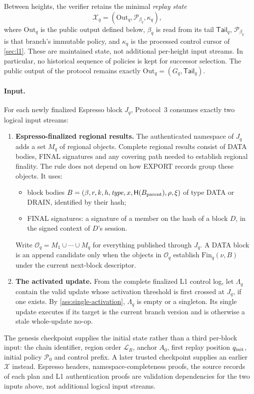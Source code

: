 \documentclass[11pt,a4paper]{article}
\newcommand{\Hash}{\mathsf H}
\newcommand{\defterm}[1]{\textcolor{rrBlue}{\textit{#1}}}
\newcounter{protocol}
\begin{document}
Between heights, the verifier retains the minimal \defterm{replay state}
\[
 \mathcal X_q=(\mathrm{Out}_q,\mathcal P_{\beta_q},\kappa_q),
\]
where $\mathrm{Out}_q$ is the public output defined below, $\beta_q$
is read from its tail $\mathsf{Tail}_q$, $\mathcal P_{\beta_q}$ is that
branch's immutable policy, and $\kappa_q$ is the processed control cursor
of \cref{sec:l1}. These are maintained state, not additional
per-height input streams. In particular, no historical sequence of
policies is kept for successor selection. The public output of the
protocol remains exactly $\mathrm{Out}_q=(G_q,\mathsf{Tail}_q)$.

\paragraph{Input.}
\label{sec:logical-carrier}
For each newly finalized Espresso block $J_q$, Protocol~3 consumes
exactly two logical input streams:
\begin{enumerate}[label=(I\arabic*),itemsep=2pt]
\item \textbf{Espresso-finalized regional results.}  The authenticated
namespace of $J_q$ adds a set $M_q$ of regional objects.  Complete
regional results consist of DATA bodies, FINAL signatures and any
covering path needed to establish regional finality.  The rule does not
depend on how EXPORT records group these objects.  It uses:
 \begin{itemize}[itemsep=1pt]
 \item block bodies
 $B=(\beta,r,k,h,\mathit{type},x,\Hash(B_{\rm parent}),\rho,\xi)$ of type
 DATA or DRAIN, identified by their hash;
 \item FINAL signatures: a signature of a member on the hash of a block
 $D$, in the signed context of $D$'s session.
 \end{itemize}
Write $\mathcal O_q=M_1\cup\cdots\cup M_q$ for everything published
through $J_q$. A DATA block is an append candidate only when the objects
in $\mathcal O_q$ establish $\mathrm{Fin}_q(\nu,B)$ under the current
next-block descriptor.
\item \textbf{The activated update.} From the complete finalized L1
control log, let $\Lambda_q$ contain the valid update whose activation
threshold is first crossed at $J_q$, if one exists. By
\cref{ass:single-activation}, $\Lambda_q$ is empty or a singleton. Its
single update executes if its target is the current branch version and
is otherwise a stale whole-update no-op.
\end{enumerate}
The genesis checkpoint supplies the initial state rather than a third
per-block input: the chain identifier, region order $\mathcal L_R$,
anchor $A_0$, first replay position $q_{\rm init}$, initial policy
$\mathcal P_0$ and control prefix. A later trusted checkpoint supplies an
earlier $\mathcal X$ instead. Espresso headers, namespace-completeness
proofs, the source records of each plan and L1 authentication proofs are
validation dependencies for the two inputs above, not additional logical
input streams.
\end{document}
